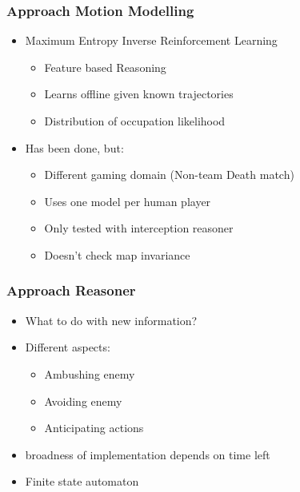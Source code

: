 \documentclass{beamer}
\begin{document}
\begin{frame}
\frametitle{Approach Motion Modelling}
\begin{itemize}
    \item Maximum Entropy Inverse Reinforcement Learning
    \begin{itemize}
        \item Feature based Reasoning
        \item Learns offline given known trajectories
        \item Distribution of occupation likelihood
    \end{itemize}
    \item Has been done, but:
        \begin{itemize}
            \item Different gaming domain (Non-team Death match)
            \item Uses one model per human player
            \item Only tested with interception reasoner
            \item Doesn't check map invariance
        \end {itemize}
\end{itemize}
\end{frame}

\begin{frame}
\frametitle{Approach Reasoner}
\begin{itemize}
    \item What to do with new information?
    \item Different aspects:
    \begin{itemize}
        \item Ambushing enemy
        \item Avoiding enemy
        \item Anticipating actions
    \end{itemize}
    \item broadness of implementation depends on time left
    \item Finite state automaton
\end{itemize}
\end{frame}
\end{document}
